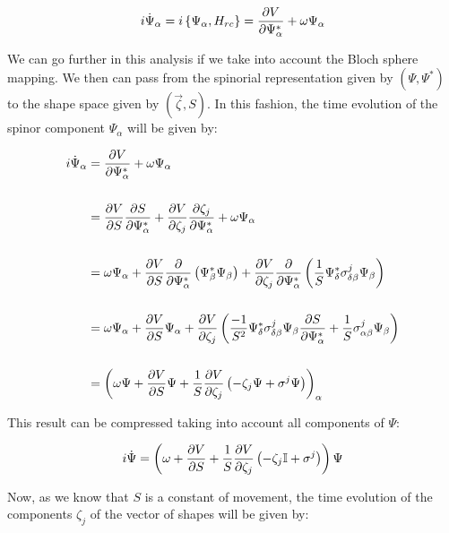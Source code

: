 \begin{align*}
i\dot{\Psi}_\alpha = i\left\lbrace \Psi_\alpha, H_{rc} \right\rbrace = \frac{\partial V}{\partial \Psi_\alpha^*} + \omega \Psi_\alpha
\end{align*}

We can go further in this analysis if we take into account the Bloch sphere mapping. We then can pass from the spinorial representation given by $(\Psi,\Psi^*)$ to the shape space given by $(\vec{\zeta},S)$. In this fashion, the time evolution of the spinor component $\Psi_\alpha$ will be given by:

\begin{align*}
i\dot{\Psi}_\alpha &= \frac{\partial V}{\partial \Psi_\alpha^*} + \omega\Psi_\alpha\\
\\
&=  \frac{\partial V}{\partial S}\frac{\partial S}{\partial \Psi_\alpha^*}+ \frac{\partial V}{\partial \zeta_j}\frac{\partial \zeta_j}{\partial \Psi_\alpha^*} + \omega\Psi_\alpha  \\
\\
&= \omega \Psi_\alpha + \frac{\partial V}{\partial S}\frac{\partial}{\partial \Psi_\alpha^*}\left( \Psi^*_\beta\Psi_\beta \right) + \frac{\partial V}{\partial \zeta_j}\frac{\partial}{\partial \Psi_\alpha^*}\left( \frac{1}{S}\Psi^*_{\delta}\sigma^j_{\delta\beta}\Psi_\beta \right)\\
\\
&= \omega \Psi_\alpha + \frac{\partial V}{\partial S}\Psi_\alpha +\frac{\partial V}{\partial \zeta_j}\left(  \frac{-1}{S^2}\Psi^*_{\delta}\sigma^j_{\delta\beta}\Psi_\beta\frac{\partial S}{\partial \Psi_\alpha^*} +\frac{1}{S}\sigma^j_{\alpha\beta}\Psi_\beta \right)\\
\\
&= \left( \omega \Psi +\frac{\partial V}{\partial S}\Psi+ \frac{1}{S}\frac{\partial V}{\partial \zeta_j}\left( -\zeta_j \Psi + \sigma^j \Psi \right) \right)_\alpha
\end{align*}

This result can be compressed taking into account all components of $\Psi$:

\begin{equation}
i\dot{\Psi} = \left( \omega +\frac{\partial V}{\partial S}+ \frac{1}{S}\frac{\partial V}{\partial \zeta_j}\left( -\zeta_j \mathbb{I}  + \sigma^j  \right) \right)\Psi
\label{eq:Psi_time_ev}
\end{equation}

Now, as we know that $S$ is a constant of movement, the time evolution of the components $\zeta_j$  of the vector of shapes will be given by:


